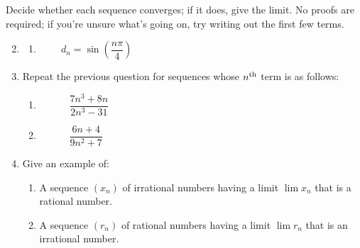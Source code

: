 
\vfil

\begin{exercisessec}{}{}
	\exstart %
	Decide whether each sequence converges; if it does, give the limit. No proofs are required; if you're unsure what's going on, try writing out the first few terms.
	\begin{enumerate}\setcounter{enumi}{1}
	  \item[]\begin{enumerate}
	    \item {} \  \  \ $d_n=\sin\left(\dfrac{n\pi}4\right)$
	  \end{enumerate}

	  
	  \item Repeat the previous question for sequences whose $n\textsuperscript{th}$ term is as follows:
	  \begin{enumerate}
	    \item {} \  \  \   \ $\dfrac{7n^3+8n}{2n^3-31}$
	    \setcounter{enumii}{5}
	    \item {} \  \  \   \ $\dfrac{6n+4}{9n^2+7}$
	  \end{enumerate}

	  
	  \item Give an example of:
	  \begin{enumerate}
		  \item A sequence $(x_n)$ of irrational numbers having a limit $\lim x_n$ that is a rational number.
		  \item A sequence $(r_n)$ of rational numbers having a limit $\lim r_n$ that is an irrational number.
	  \end{enumerate}
	  

\end{enumerate}
\end{exercisessec}
